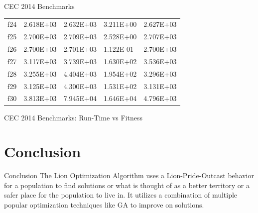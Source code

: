\documentclass[xcolor=table]{beamer}
\begin{document}
\begin{frame}{CEC 2014 Benchmarks}
\begin{table}[]
{\begin{tabular}{lllll}
f24 & \cellcolor[HTML]{67FD9A}2.618E+03 & \cellcolor[HTML]{67FD9A}2.632E+03 & \cellcolor[HTML]{67FD9A}3.211E+00 & \cellcolor[HTML]{67FD9A}2.627E+03 \\
f25 & \cellcolor[HTML]{67FD9A}2.700E+03 & \cellcolor[HTML]{67FD9A}2.709E+03 & \cellcolor[HTML]{67FD9A}2.528E+00 & \cellcolor[HTML]{67FD9A}2.707E+03 \\
f26 & \cellcolor[HTML]{67FD9A}2.700E+03 & \cellcolor[HTML]{67FD9A}2.701E+03 & \cellcolor[HTML]{67FD9A}1.122E-01 & \cellcolor[HTML]{67FD9A}2.700E+03 \\
f27 & \cellcolor[HTML]{67FD9A}3.117E+03 & \cellcolor[HTML]{67FD9A}3.739E+03 & \cellcolor[HTML]{67FD9A}1.630E+02 & \cellcolor[HTML]{67FD9A}3.536E+03 \\
f28 & \cellcolor[HTML]{67FD9A}3.255E+03 & \cellcolor[HTML]{67FD9A}4.404E+03 & \cellcolor[HTML]{67FD9A}1.954E+02 & \cellcolor[HTML]{67FD9A}3.296E+03 \\
f29 & \cellcolor[HTML]{67FD9A}3.125E+03 & \cellcolor[HTML]{67FD9A}4.300E+03 & \cellcolor[HTML]{67FD9A}1.531E+02 & \cellcolor[HTML]{67FD9A}3.131E+03 \\
f30 & \cellcolor[HTML]{67FD9A}3.813E+03 & \cellcolor[HTML]{67FD9A}7.945E+04 & \cellcolor[HTML]{67FD9A}1.646E+04 & \cellcolor[HTML]{67FD9A}4.796E+03
\end{tabular}}
\end{table}
\end{frame}

\begin{frame}{CEC 2014 Benchmarks: Run-Time vs Fitness}
\end{frame}

\section{Conclusion}

\begin{frame}{Conclusion}
The Lion Optimization Algorithm uses a Lion-Pride-Outcast behavior for a population to find solutions or what is thought of as a better territory or a safer place for the population to live in. It utilizes a combination of multiple popular optimization techniques like GA to improve on solutions.
\end{frame}
\end{document}

